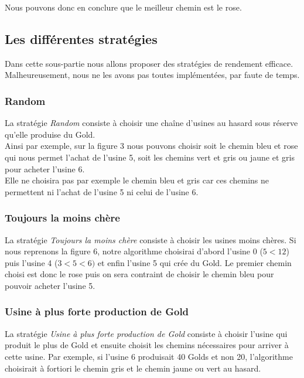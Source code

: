 Nous pouvons donc en conclure que le meilleur chemin est le rose. 

\subsection{Les différentes stratégies}

Dans cette sous-partie nous allons proposer des stratégies de rendement efficace. Malheureusement, nous ne les avons pas toutes implémentées, par faute de temps.

\subsubsection{Random}

La stratégie \textit{Random} consiste à choisir une chaîne d'usines au hasard sous réserve qu'elle produise du Gold. \\
\indent Ainsi par exemple, sur la figure 3 nous pouvons choisir soit le chemin bleu et rose qui nous permet l'achat de l'usine 5, soit les chemins vert et gris ou jaune et gris pour acheter l'usine 6. \\
\indent Elle ne choisira pas par exemple le chemin bleu et gris car ces chemins ne permettent ni l'achat de l'usine 5 ni celui de l'usine 6.

\subsubsection{Toujours la moins chère}

La stratégie \textit{Toujours la moins chère} consiste à choisir les usines moins chères. Si nous reprenons la figure 6, notre algorithme choisirai d'abord l'usine 0 ($5 < 12$) puis l'usine 4 ($3 < 5 <6)$ et enfin l'usine 5 qui crée du Gold. Le premier chemin choisi est donc le rose puis on sera contraint de choisir le chemin bleu pour pouvoir acheter l'usine 5.

\subsubsection{Usine à plus forte production de Gold}

La stratégie \textit{Usine à plus forte production de Gold} consiste à choisir l'usine qui produit le plus de Gold et ensuite choisit les chemins nécessaires pour arriver à cette usine. Par exemple, si l'usine 6 produisait 40 Golds et non 20, l'algorithme choisirait à fortiori le chemin gris et le chemin jaune ou vert au hasard.

